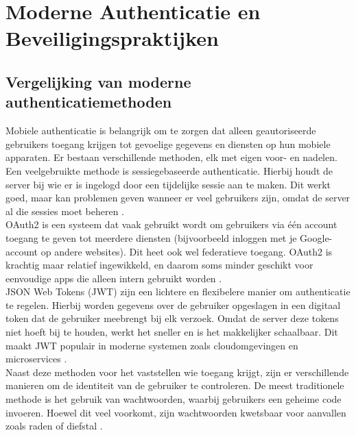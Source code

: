 \section{Moderne Authenticatie en Beveiligingspraktijken}

\subsection{Vergelijking van moderne authenticatiemethoden}

Mobiele authenticatie is belangrijk om te zorgen dat alleen geautoriseerde gebruikers toegang krijgen tot gevoelige gegevens en diensten op hun mobiele apparaten. Er bestaan verschillende methoden, elk met eigen voor- en nadelen.\\

Een veelgebruikte methode is sessiegebaseerde authenticatie. Hierbij houdt de server bij wie er is ingelogd door een tijdelijke sessie aan te maken. Dit werkt goed, maar kan problemen geven wanneer er veel gebruikers zijn, omdat de server al die sessies moet beheren \autocite{Gao2023}.\\

OAuth2 is een systeem dat vaak gebruikt wordt om gebruikers via één account toegang te geven tot meerdere diensten (bijvoorbeeld inloggen met je Google-account op andere websites). Dit heet ook wel federatieve toegang. OAuth2 is krachtig maar relatief ingewikkeld, en daarom soms minder geschikt voor eenvoudige apps die alleen intern gebruikt worden \autocite{Gao2023}.\\

JSON Web Tokens (JWT) zijn een lichtere en flexibelere manier om authenticatie te regelen. Hierbij worden gegevens over de gebruiker opgeslagen in een digitaal token dat de gebruiker meebrengt bij elk verzoek. Omdat de server deze tokens niet hoeft bij te houden, werkt het sneller en is het makkelijker schaalbaar. Dit maakt JWT populair in moderne systemen zoals cloudomgevingen en microservices \autocite{Gao2023}.\\

Naast deze methoden voor het vaststellen wie toegang krijgt, zijn er verschillende manieren om de identiteit van de gebruiker te controleren. De meest traditionele methode is het gebruik van wachtwoorden, waarbij gebruikers een geheime code invoeren. Hoewel dit veel voorkomt, zijn wachtwoorden kwetsbaar voor aanvallen zoals raden of diefstal \autocite{Zukarnain2022}.\\

